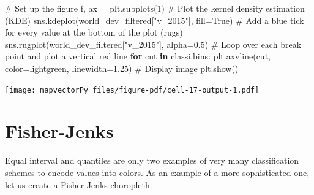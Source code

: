 \documentclass[
  letterpaper,
  DIV=11,
  numbers=noendperiod]{scrreprt}
\newenvironment{Shaded}{\begin{snugshade}}{\end{snugshade}}
\newcommand{\CommentTok}[1]{\textcolor[rgb]{0.37,0.37,0.37}{#1}}
\newcommand{\ControlFlowTok}[1]{\textcolor[rgb]{0.00,0.23,0.31}{\textbf{#1}}}
\newcommand{\DecValTok}[1]{\textcolor[rgb]{0.68,0.00,0.00}{#1}}
\newcommand{\FloatTok}[1]{\textcolor[rgb]{0.68,0.00,0.00}{#1}}
\newcommand{\KeywordTok}[1]{\textcolor[rgb]{0.00,0.23,0.31}{\textbf{#1}}}
\newcommand{\NormalTok}[1]{\textcolor[rgb]{0.00,0.23,0.31}{#1}}
\newcommand{\OperatorTok}[1]{\textcolor[rgb]{0.37,0.37,0.37}{#1}}
\newcommand{\StringTok}[1]{\textcolor[rgb]{0.13,0.47,0.30}{#1}}
\newcommand{\VariableTok}[1]{\textcolor[rgb]{0.07,0.07,0.07}{#1}}
\begin{document}
\begin{Shaded}
\begin{Highlighting}[]
\CommentTok{\# Set up the figure}
\NormalTok{f, ax }\OperatorTok{=}\NormalTok{ plt.subplots(}\DecValTok{1}\NormalTok{)}
\CommentTok{\# Plot the kernel density estimation (KDE)}
\NormalTok{sns.kdeplot(world\_dev\_filtered[}\StringTok{"v\_2015"}\NormalTok{], fill}\OperatorTok{=}\VariableTok{True}\NormalTok{)}
\CommentTok{\# Add a blue tick for every value at the bottom of the plot (rugs)}
\NormalTok{sns.rugplot(world\_dev\_filtered[}\StringTok{"v\_2015"}\NormalTok{], alpha}\OperatorTok{=}\FloatTok{0.5}\NormalTok{)}
\CommentTok{\# Loop over each break point and plot a vertical red line}
\ControlFlowTok{for}\NormalTok{ cut }\KeywordTok{in}\NormalTok{ classi.bins:}
\NormalTok{    plt.axvline(cut, color}\OperatorTok{=}\StringTok{\textquotesingle{}lightgreen\textquotesingle{}}\NormalTok{, linewidth}\OperatorTok{=}\FloatTok{1.25}\NormalTok{)}
\CommentTok{\# Display image}
\NormalTok{plt.show()}
\end{Highlighting}
\end{Shaded}

\texttt{[image: mapvectorPy\_files/figure-pdf/cell-17-output-1.pdf]}

\section*{Fisher-Jenks}\label{fisher-jenks}


Equal interval and quantiles are only two examples of very many
classification schemes to encode values into colors. As an example of a
more sophisticated one, let us create a Fisher-Jenks choropleth.
\end{document}
